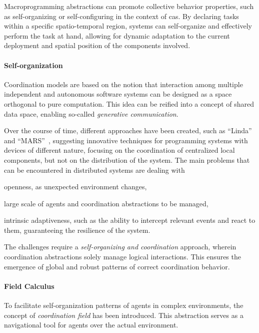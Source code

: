 \documentclass[12pt, a4paper]{article}
\newenvironment{inlinelist}{\begin{enumerate*}[label=\emph{(\roman*)}]}{\end{enumerate*}}
\begin{document}
Macroprogramming abstractions can promote collective behavior properties,
such as self-organizing or self-configuring in the context of \ac{cas}.
%
By declaring tasks within a specific spatio-temporal region,
systems can self-organize and effectively perform the task at hand,
allowing for dynamic adaptation to the current deployment and spatial position of the components involved.

\paragraph{Self-organization}
Coordination models are based on the notion that interaction among multiple independent and autonomous software systems
can be designed as a space orthogonal to pure computation.
%
This idea can be reified into a concept of shared data space, enabling so-called \emph{generative communication}.

Over the course of time, different approaches have been created,
such as ``Linda''~\cite{ViroliCoordination2012} and ``MARS''~\cite{mars},
suggesting innovative techniques for programming systems with devices of different nature,
focusing on the coordination of centralized local components,
but not on the distribution of the system.
%
The main problems that can be encountered in distributed systems are dealing with
\begin{inlinelist}
    \item openness, as unexpected environment changes,
    \item large scale of agents and coordination abstractions to be managed,
    \item intrinsic adaptiveness, such as the ability to intercept relevant events and react to them,
    guaranteeing the resilience of the system.
\end{inlinelist}

The challenges require a \emph{self-organizing and coordination} approach,
wherein coordination abstractions solely manage logical interactions.
%
This ensures the emergence of global and robust patterns of correct coordination behavior.

\paragraph{Field Calculus}
To facilitate self-organization patterns of agents in complex environments,
the concept of \emph{coordination field} has been introduced.
%
This abstraction serves as a navigational tool for agents over the actual environment.
\end{document}
